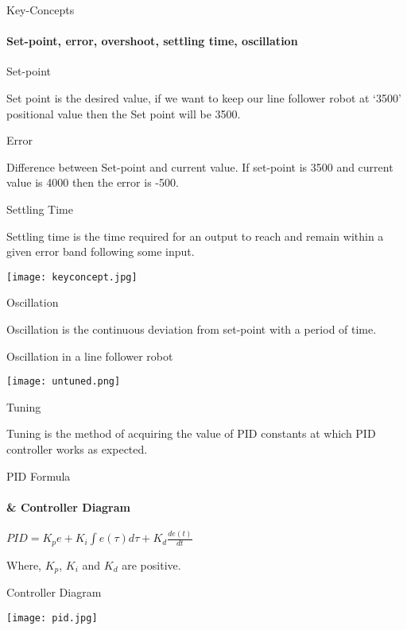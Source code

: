 \documentclass{beamer}
\begin{document}
  \begin{frame}[allowframebreaks]{Key-Concepts}
  
  \framesubtitle{Set-point, error, overshoot, settling time, oscillation}
  
  \begin{alertblock}{Set-point}
  
  
   Set point is the desired value, if we want to keep our line follower robot at `3500' positional value then the Set point will be 3500.
   
   \end{alertblock}
   
   
   \begin{alertblock}{Error}
   
		Difference between Set-point and current value. If set-point is 3500 and current value is 4000 then the error is -500.   
   
   \end{alertblock}
   
   \begin{alertblock}{Settling Time}
   
   	Settling time is the time required for an output to reach and remain within a given error band following some input.
		   
		   
		   \texttt{[image: keyconcept.jpg]}
   
   \end{alertblock}
   
   \begin{alertblock}{Oscillation}
   
		Oscillation is the continuous deviation from set-point with a period of time. 
		
		\bigskip		
		
		Oscillation in a line follower robot
		
		\texttt{[image: untuned.png]}      
   
   \end{alertblock}
   
   \begin{alertblock}{Tuning}
		
		Tuning is the method of acquiring the value of PID constants at which PID controller works as expected.   
   
   \end{alertblock}
  
  \end{frame}
  
  \begin{frame}{PID Formula}
  \framesubtitle{\& Controller Diagram}
 		
 	$PID = K_{p}  e + K_{i}   \int e(\tau) d\tau + K_{d}  \frac{de(t)}{dt} $
 	
 	Where, $K_{p}$, $K_{i}$ and $K_{d}$ are positive.  
 	
 	\begin{alertblock}{Controller Diagram}
 		
 		\texttt{[image: pid.jpg]}
 	
 	\end{alertblock}
  
  \end{frame}
  
\end{document}
